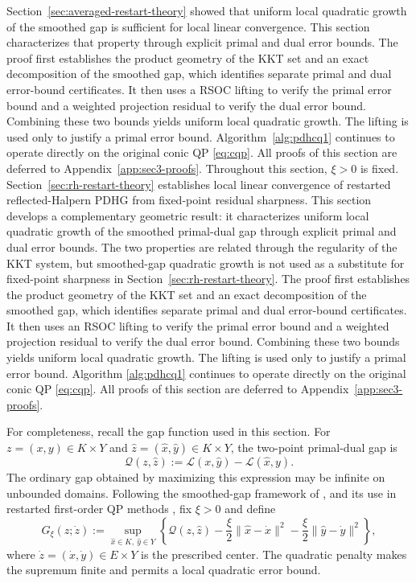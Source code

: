 \documentclass[letterpaper]{article} %
\theoremstyle{definition}
\theoremstyle{remark}
\newcommand{\AVERAGEDPDHG}{}
\begin{document}
\ifdefined\AVERAGEDPDHG
Section~\ref{sec:averaged-restart-theory} showed that uniform local
quadratic growth of the smoothed gap is sufficient for local linear
convergence.  This section characterizes that property through explicit
primal and dual error bounds.  The proof first establishes the product
geometry of the KKT set and an exact decomposition of the smoothed gap, which
identifies separate primal and dual error-bound certificates.  It then uses a
RSOC lifting to verify the primal error bound and a weighted projection
residual to verify the dual error bound.  Combining these two bounds yields
uniform local quadratic growth.  The lifting is used only to justify a primal
error bound.  Algorithm~\ref{alg:pdhcq1} continues to operate directly on the
original conic QP \eqref{eq:cqp}.  All proofs of this section are deferred to Appendix~\ref{app:sec3-proofs}.  Throughout this section, $\xi>0$ is fixed.
\else
Section~\ref{sec:rh-restart-theory} establishes local linear convergence of
restarted reflected-Halpern PDHG from fixed-point residual sharpness.  This
section develops a complementary geometric result: it characterizes uniform
local quadratic growth of the smoothed primal-dual gap through explicit
primal and dual error bounds.  The two properties are related through the
regularity of the KKT system, but smoothed-gap quadratic growth is not used as
a substitute for fixed-point sharpness in Section~\ref{sec:rh-restart-theory}.
The proof first establishes the product geometry of the KKT set and an exact
decomposition of the smoothed gap, which identifies separate primal and dual
error-bound certificates.  It then uses an RSOC lifting to verify the
primal error bound and a weighted projection residual to verify the dual
error bound.  Combining these two bounds yields uniform local quadratic
growth.
The lifting is used only to justify a primal error bound.  Algorithm
\ref{alg:pdhcq1} continues to operate directly on the original conic QP
\eqref{eq:cqp}.  All proofs of this section are deferred to Appendix~\ref{app:sec3-proofs}.

For completeness, recall the gap function used in this section.  For
$z=(x,y)\in K\times Y$ and
$\widehat z=(\widehat x,\widehat y)\in K\times Y$, the two-point
primal-dual gap is
\begin{equation}
\label{eq:ordinary-duality-gap}
    \mathcal Q(z,\widehat z)
    :=
    \mathcal L(x,\widehat y)-\mathcal L(\widehat x,y).
\end{equation}
The ordinary gap obtained by maximizing this expression may be infinite on
unbounded domains.  Following the smoothed-gap framework of
\cite{fercoq2022quadratic}, and its use in restarted first-order QP methods
\cite{lu2023practical,huang2025restarted}, fix $\xi>0$ and define
\begin{equation}
\label{eq:smoothed-gap}
    G_\xi(z;\dot z)
    :=
    \sup_{\widehat x\in K,\ \widehat y\in Y}
    \left\{
        \mathcal Q(z,\widehat z)
        -\frac{\xi}{2}\|\widehat x-\dot x\|^2
        -\frac{\xi}{2}\|\widehat y-\dot y\|^2
    \right\},
\end{equation}
where $\dot z=(\dot x,\dot y)\in E\times Y$ is the prescribed center.  The
quadratic penalty makes the supremum finite and permits a local quadratic
error bound.
\fi
\end{document}
